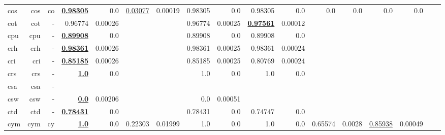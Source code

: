 \documentclass[11pt]{article}
\begin{document}
\begin{table*}[h]
{\begin{tabular}{lrrrrrrrrrrrrrrrr}
cos         & cos         & co         & \textbf{\underline{0.98305}}         & 0.0         & \underline{0.03077}         & 0.00019         & 0.98305         & 0.0         & 0.98305         & 0.0         & 0.0         & 0.0         & 0.0         & 0.0         \\
cot         & cot         & -         & 0.96774         & 0.00026         &          &          & 0.96774         & 0.00025         & \textbf{\underline{0.97561}}         & 0.00012         &          &          &          &          \\
cpu         & cpu         & -         & \textbf{\underline{0.89908}}         & 0.0         &          &          & 0.89908         & 0.0         & 0.89908         & 0.0         &          &          &          &          \\
crh         & crh         & -         & \textbf{\underline{0.98361}}         & 0.00026         &          &          & 0.98361         & 0.00025         & 0.98361         & 0.00024         &          &          &          &          \\
cri         & cri         & -         & \textbf{\underline{0.85185}}         & 0.00026         &          &          & 0.85185         & 0.00025         & 0.80769         & 0.00024         &          &          &          &          \\
crs         & crs         & -         & \textbf{\underline{1.0}}         & 0.0         &          &          & 1.0         & 0.0         & 1.0         & 0.0         &          &          &          &          \\
csa         & csa         & -         &          &          &          &          &          &          &          &          &          &          &          &          \\
csw         & csw         & -         & \textbf{\underline{0.0}}         & 0.00206         &          &          & 0.0         & 0.00051         &          &          &          &          &          &          \\
ctd         & ctd         & -         & \textbf{\underline{0.78431}}         & 0.0         &          &          & 0.78431         & 0.0         & 0.74747         & 0.0         &          &          &          &          \\
cym         & cym         & cy         & \textbf{\underline{1.0}}         & 0.0         & 0.22303         & 0.01999         & 1.0         & 0.0         & 1.0         & 0.0         & 0.65574         & 0.0028         & \underline{0.85938}         & 0.00049         \\

\end{tabular}}
\end{table*}
\end{document}
